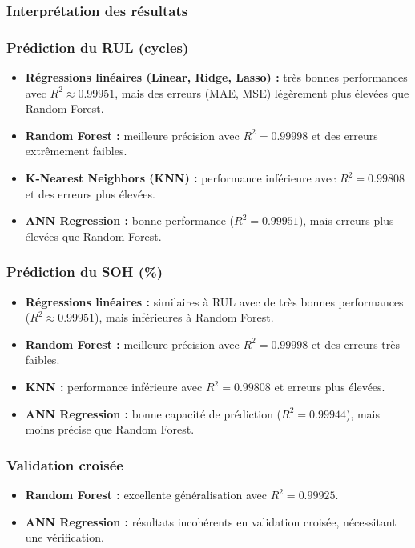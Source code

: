 \subsubsection{Interprétation des résultats}

\subsubsection*{Prédiction du RUL (cycles)}
\begin{itemize}
	\item \textbf{Régressions linéaires (Linear, Ridge, Lasso) :} très bonnes performances avec $R^2 \approx 0.99951$, mais des erreurs (MAE, MSE) légèrement plus élevées que Random Forest.
	\item \textbf{Random Forest :} meilleure précision avec $R^2 = 0.99998$ et des erreurs extrêmement faibles.
	\item \textbf{K-Nearest Neighbors (KNN) :} performance inférieure avec $R^2 = 0.99808$ et des erreurs plus élevées.
	\item \textbf{ANN Regression :} bonne performance ($R^2 = 0.99951$), mais erreurs plus élevées que Random Forest.
\end{itemize}

\subsubsection*{Prédiction du SOH (\%)}
\begin{itemize}
	\item \textbf{Régressions linéaires :} similaires à RUL avec de très bonnes performances ($R^2 \approx 0.99951$), mais inférieures à Random Forest.
	\item \textbf{Random Forest :} meilleure précision avec $R^2 = 0.99998$ et des erreurs très faibles.
	\item \textbf{KNN :} performance inférieure avec $R^2 = 0.99808$ et erreurs plus élevées.
	\item \textbf{ANN Regression :} bonne capacité de prédiction ($R^2 = 0.99944$), mais moins précise que Random Forest.
\end{itemize}

\subsubsection*{Validation croisée}
\begin{itemize}
	\item \textbf{Random Forest :} excellente généralisation avec $R^2 = 0.99925$.
	\item \textbf{ANN Regression :} résultats incohérents en validation croisée, nécessitant une vérification.
\end{itemize}

